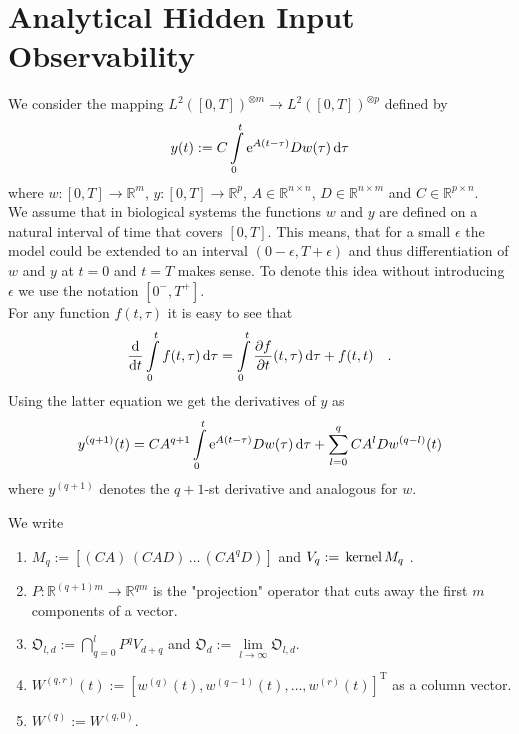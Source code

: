 \section{Analytical Hidden Input Observability}

We consider the mapping $L^2([0,T])^{\otimes m}\to L^2([0,T])^{\otimes p}$ defined by 
\begin{equation}
y(t) := C \int\limits_0^t \text{e}^{A(t-\tau)} D w(\tau) \, \text{d} \tau \label{eq:y}
\end{equation}
where $w:[0,T]\to \mathbb{R}^m$, $y:[0,T]\to \mathbb{R}^p$, $A\in\mathbb{R}^{n\times n}$, 
$D\in\mathbb{R}^{n\times m}$ and $C\in\mathbb{R}^{p\times n}$. \\

We assume that in biological systems the functions $w$ and $y$ are defined on 
a natural interval of time that covers $[0,T]$. This means, that for a small $\epsilon$ the 
model could be extended to an interval $(0-\epsilon , T+\epsilon)$ and thus differentiation 
of $w$ and $y$ at $t=0$ and $t=T$ makes sense. To denote this idea without 
introducing $\epsilon$ we use the notation $[0^-,T^+]$.
\\

For any function $f(t,\tau)$ it is easy to see that
\begin{equation}
	\frac{\text{d}}{\text{d} t} \int\limits_0^t f(t,\tau) \, \text{d}\tau = \int\limits_0^t
	\frac{\partial f}{\partial t}(t,\tau)\,\text{d}\tau + f(t,t) \quad . 
\end{equation}
Using the latter equation we get the derivatives of $y$ as
\begin{equation}
	y^{(q+1)}(t) = CA^{q+1} \int\limits_0^t \text{e}^{A(t-\tau)} D w(\tau) \, \text{d} \tau + 
	\sum\limits_{l=0}^q  CA^lD w^{(q-l)}(t) \label{eq:y_derivatives}
\end{equation}
where $y^{(q+1)}$ denotes the $q+1$-st derivative and analogous for $w$.

\begin{definition}{}{}
	We write
	\begin{enumerate}
	\item $M_q := \left[ (CA) \,(CAD) \, \ldots \, (CA^qD) \right]$ and 
	$V_q := \, \text{kernel}\,M_q \,\,$. 
	\item $P:\mathbb{R}^{(q+1)m}\to \mathbb{R}^{qm}$ is the "projection" operator that 
	cuts away the first $m$ components of a vector. 
	\item $\mathfrak{O}_{l,d} := \bigcap\limits_{q=0}^l P^q V_{d+q}$ 
	and $\mathfrak{O}_d:= \lim\limits_{l\to \infty} \mathfrak{O}_{l,d}$.
	\item $W^{(q,r)}(t):=\left[ w^{(q)}(t) ,w^{(q-1)}(t),\ldots ,w^{(r)}(t)
	 \right]^\text{T}$ as a column vector. 
	 \item $W^{(q)}:=W^{(q,0)}$.
	\end{enumerate}
\end{definition}

